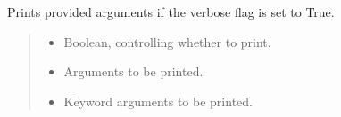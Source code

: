 \documentclass[letterpaper,10pt,english]{sphinxmanual}
\begin{document}
\begin{fulllineitems}
\label{\detokenize{docs/utilities:utilities.conditional_print}}
\pysigstartsignatures
{}
\pysigstopsignatures
\sphinxAtStartPar
Prints provided arguments if the verbose flag is set to True.
\begin{quote}\begin{description}
\begin{itemize}
\item {} 
\sphinxAtStartPar
{} \textendash{} Boolean, controlling whether to print.

\item {} 
\sphinxAtStartPar
{} \textendash{} Arguments to be printed.

\item {} 
\sphinxAtStartPar
{} \textendash{} Keyword arguments to be printed.

\end{itemize}

\end{description}\end{quote}

\end{fulllineitems}

\end{document}
